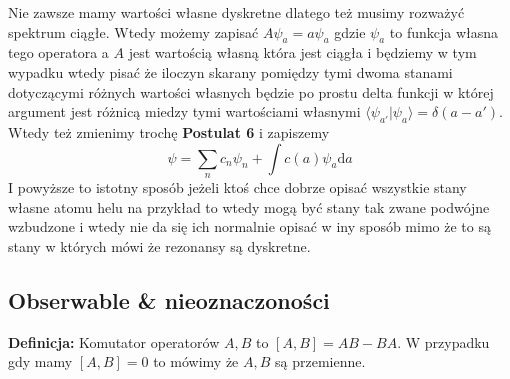Nie zawsze mamy wartości własne dyskretne dlatego też musimy rozważyć spektrum ciągłe. Wtedy możemy zapisać $A \psi_a = a \psi_a$ gdzie $\psi_a$ to funkcja własna tego operatora a $A$ jest wartością własną która jest ciągła i będziemy w tym wypadku wtedy pisać że iloczyn skarany pomiędzy tymi dwoma stanami dotyczącymi różnych wartości własnych będzie po prostu delta funkcji w której argument jest różnicą miedzy tymi wartościami własnymi $\langle \psi_{a'} | \psi_a  \rangle = \delta(a - a')$.
Wtedy też zmienimy trochę \textbf{Postulat 6} i zapiszemy
\begin{equation*}
	\psi = \sum_n c_n \psi_n + \int c(a) \psi_a \text{d}a
\end{equation*}
I powyższe to istotny sposób jeżeli ktoś chce dobrze opisać wszystkie stany własne atomu helu na przykład to wtedy mogą być stany tak zwane podwójne wzbudzone i wtedy nie da się ich normalnie opisać w iny sposób mimo że to są stany w których mówi że rezonansy są dyskretne.
\subsection{Obserwable \& nieoznaczoności}
\textbf{Definicja:} Komutator operatorów $A, B$ to $[A, B] = AB - BA$.
W przypadku gdy mamy $[A, B] = 0$ to mówimy że $A, B$ są przemienne.

